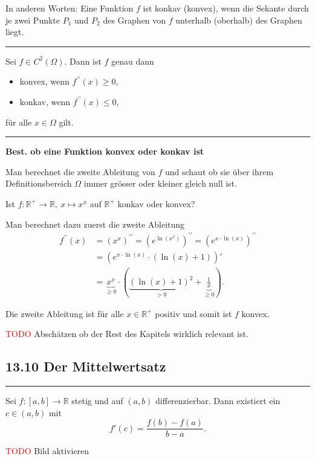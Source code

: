 \documentclass[a4paper,landscape,8pt]{extarticle}
\newcommand{\R}{\mathbb{R}}
\newcommand{\todo}{\textcolor{red}{TODO }}
\newcommand{\sep}{\vspace{5pt}\noindent\hrule\vspace{5pt}}
\begin{document}
\begin{multicols*}{4}
In anderen Worten: Eine Funktion $f$ ist konkav (konvex), wenn die Sekante
durch je zwei Punkte $P_1$ und $P_2$ des Graphen von $f$ unterhalb (oberhalb)
des Graphen liegt.

\sep

\Satz Sei $f\in C^2(\Omega)$. Dann ist $f$ genau dann
\begin{itemize}
  \item konvex, wenn $f^{\prime\prime}(x)\geq 0 $,
  \item konkav, wenn $f^{\prime\prime}(x)\leq 0 $,
\end{itemize}
für alle $x\in\Omega$ gilt.

\sep

\textbf{Best. ob eine Funktion konvex oder konkav ist}

\Vorgehen Man berechnet die zweite Ableitung von $f$ und schaut ob sie über
ihrem Definitionsbereich $\Omega$ immer grösser oder kleiner gleich null ist.

\Bsp Ist $f\colon \R^+\to\R, \ x\mapsto x^x$ auf $\R^+$ konkav oder konvex?

Man berechnet dazu zuerst die zweite Ableitung
\begin{align*}
f^{\prime\prime}(x) &= (x^x)^{\prime\prime} = (e^{\ln(x^x)})^{\prime\prime}
 = (e^{x\cdot\ln(x)})^{\prime\prime}\\
&= \left(e^{x \cdot\ln(x)}\cdot\left(\ln(x) + 1\right)\right)'\\
&= \underbrace{x^x}_{\geq 0} \cdot (\underbrace{(\ln(x) +
1)^2}_{> 0}+\underbrace{\frac{1}{x}}_{\geq 0}).
\end{align*}

Die zweite Ableitung ist für alle $x\in\R^+$ positiv und somit ist $f$ konvex.

\begin{warmup}
\todo Abschätzen ob der Rest des Kapitels wirklich relevant ist.
\end{warmup}


\subsection{13.10 Der Mittelwertsatz}

\sep

\Satz Sei $f\colon[a,b]\to\R$	 stetig und auf $(a,b)$ differenzierbar. Dann
existiert ein $c\in(a,b)$ mit
\[
f'(c) = \frac{f(b)-f(a)}{b-a}.
\]

\begin{warmup}
\todo Bild aktivieren
\end{warmup}


\end{multicols*}
\end{document}

